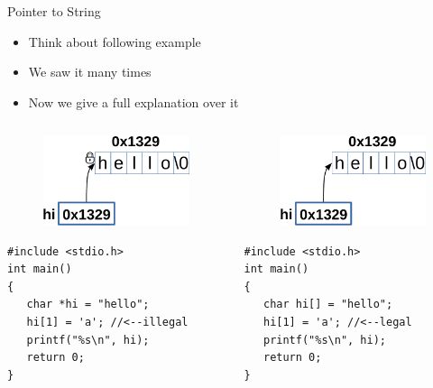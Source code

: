 \begin{frame}[fragile]{Pointer to String}
\begin{itemize}
	\item {Think about following example}
	\item {We saw it many times}
	\item {Now we give a full explanation over it}
\end{itemize}
\vspace{-0.2in}
\begin{columns}
\begin{column}{0.5\linewidth}
\begin{figure}
	\includegraphics[width=0.55\linewidth]{figs/himem.pdf}
\end{figure}
\begin{lstlisting}[xleftmargin=0.05\linewidth, linewidth=0.95\linewidth]
#include <stdio.h>
int main()
{
   char *hi = "hello";
   hi[1] = 'a'; //<--illegal
   printf("%s\n", hi);
   return 0;
}
\end{lstlisting}
\end{column}
\begin{column}{0.5\linewidth}
\begin{figure}
	\includegraphics[width=0.6\linewidth]{figs/himem1.pdf}
\end{figure}
\begin{lstlisting}
#include <stdio.h>
int main()
{
   char hi[] = "hello";
   hi[1] = 'a'; //<--legal
   printf("%s\n", hi);
   return 0;
}
\end{lstlisting}
\end{column}
\end{columns}

\end{frame}

